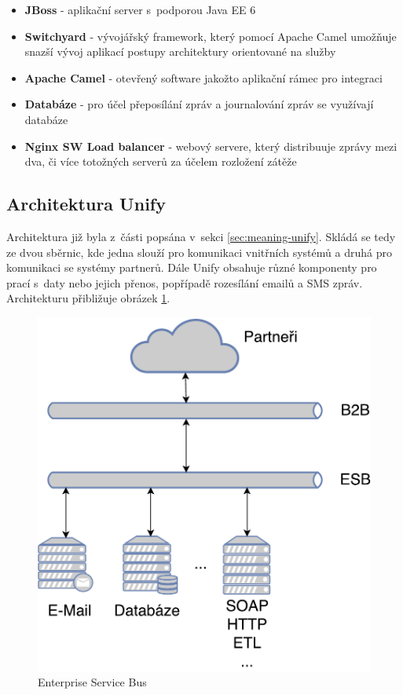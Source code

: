 \documentclass[thesis=M,czech]{FITthesis}[2012/10/20]
\newcommand{\tmpframe}[1]{\fbox{#1}}
\renewcommand{\tmpframe}[1]{#1}
\begin{document}
			\begin{itemize} 
				\item \textbf{JBoss} - aplikační server s~podporou Java EE 6 \cite{oracleJavaEE6}
				\item \textbf{Switchyard} - vývojářský framework, který pomocí Apache Camel  umožňuje snazší vývoj aplikací postupy architektury orientované na služby 
				\item \textbf{Apache Camel } - otevřený software jakožto aplikační rámec pro integraci
				\item \textbf{Databáze} - pro účel přeposílání zpráv a journalování zpráv se využívají databáze
				\item \textbf{Nginx SW Load balancer} - webový servere, který distribuuje zprávy mezi dva, či více totožných serverů za účelem rozložení zátěže   		
			\end{itemize}
			
			
		\subsection{Architektura Unify}
			Architektura již byla z~části popsána v~sekci \ref{sec:meaning-unify}. Skládá se tedy ze dvou sběrnic, kde jedna slouží pro komunikaci vnitřních systémů a druhá pro komunikaci se systémy partnerů. Dále Unify obsahuje různé komponenty pro prací s~daty nebo jejich přenos, popřípadě rozesílání emailů a SMS zpráv.
			Architekturu přibližuje obrázek \ref{fig:esb}. 
			
			\begin{figure}[htb]\centering
				\tmpframe{\includegraphics[scale=0.5]{./img/Unify-Easy}}		
				\caption{Enterprise Service Bus}
				\label{fig:esb}
			\end{figure}
		
\end{document}
